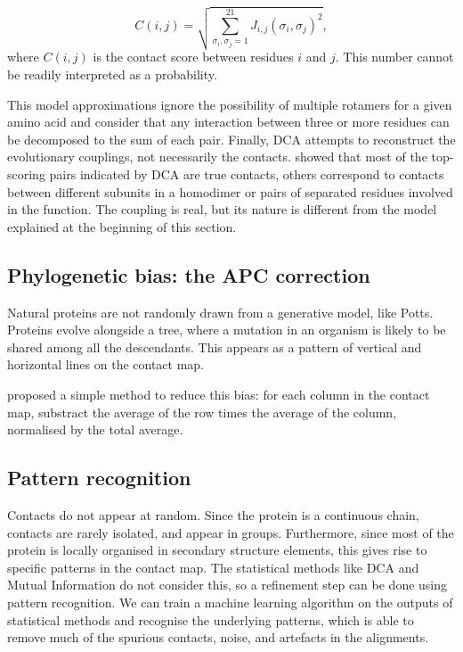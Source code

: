 \begin{equation*}
C(i, j) = \sqrt{\sum_{\sigma_i, \sigma_j=1}^{21} J_{i, j}(\sigma_i, \sigma_j)^2},
\end{equation*}
where $C(i, j)$ is the contact score between residues $i$ and $j$.
This number cannot be readily interpreted as a probability.

This model approximations ignore the possibility of multiple rotamers for a given amino acid 
and consider that any interaction between three or more residues can be decomposed to the sum of each pair.
Finally, DCA attempts to reconstruct the evolutionary couplings, not necessarily the contacts.
\citet{contact_errors} showed that most of the top-scoring pairs indicated by DCA are true contacts, others correspond to contacts between different subunits in a homodimer or pairs of separated residues involved in the function.
The coupling is real, but its nature is different from the model explained at the beginning of this section.

\subsection{Phylogenetic bias: the APC correction}
Natural proteins are not randomly drawn from a generative model, like Potts.
Proteins evolve alongside a tree, where a mutation in an organism is likely to be shared among all the descendants.
This appears as a pattern of vertical and horizontal lines on the contact map.

\citet{apc} proposed a simple method to reduce this bias: for each column in the contact map, substract the average of the row times the average of the column, normalised by the total average.


\subsection{Pattern recognition}
Contacts do not appear at random.
Since the protein is a continuous chain, contacts are rarely isolated, and appear in groups.
Furthermore, since most of the protein is locally organised in secondary structure elements, this gives rise to specific patterns in the contact map.
The statistical methods like DCA and Mutual Information do not consider this, so a refinement step can be done using pattern recognition.
We can train a machine learning algorithm on the outputs of statistical methods and recognise the underlying patterns, which is able to remove much of the spurious contacts, noise, and artefacts in the alignments.

